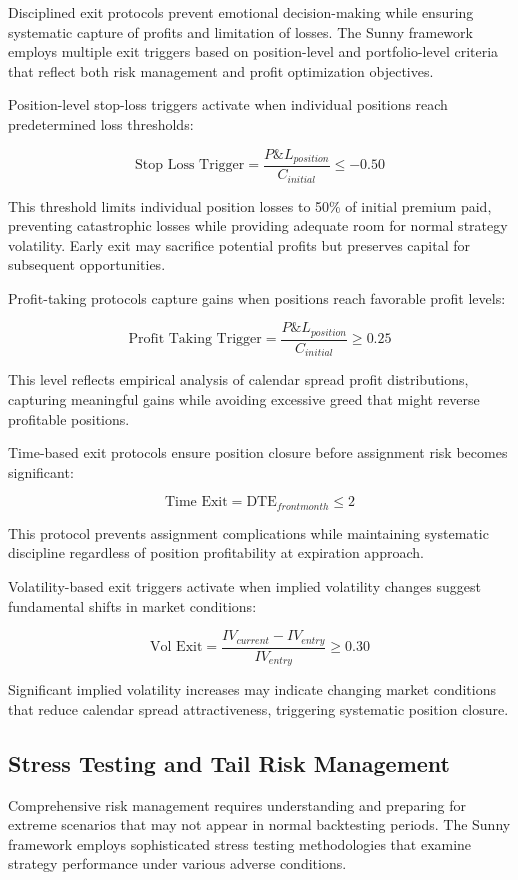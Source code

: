 \documentclass[
  american,
  11pt,
  11pt,
  letterpaper,
  onecolumn]{article}
\begin{document}
Disciplined exit protocols prevent emotional decision-making while
ensuring systematic capture of profits and limitation of losses. The
Sunny framework employs multiple exit triggers based on position-level
and portfolio-level criteria that reflect both risk management and
profit optimization objectives.

Position-level stop-loss triggers activate when individual positions
reach predetermined loss thresholds:

\[\text{Stop Loss Trigger} = \frac{P\&L_{position}}{C_{initial}} \leq -0.50\]

This threshold limits individual position losses to 50\% of initial
premium paid, preventing catastrophic losses while providing adequate
room for normal strategy volatility. Early exit may sacrifice potential
profits but preserves capital for subsequent opportunities.

Profit-taking protocols capture gains when positions reach favorable
profit levels:

\[\text{Profit Taking Trigger} = \frac{P\&L_{position}}{C_{initial}} \geq 0.25\]

This level reflects empirical analysis of calendar spread profit
distributions, capturing meaningful gains while avoiding excessive greed
that might reverse profitable positions.

Time-based exit protocols ensure position closure before assignment risk
becomes significant:

\[\text{Time Exit} = \text{DTE}_{front month} \leq 2\]

This protocol prevents assignment complications while maintaining
systematic discipline regardless of position profitability at expiration
approach.

Volatility-based exit triggers activate when implied volatility changes
suggest fundamental shifts in market conditions:

\[\text{Vol Exit} = \frac{IV_{current} - IV_{entry}}{IV_{entry}} \geq 0.30\]

Significant implied volatility increases may indicate changing market
conditions that reduce calendar spread attractiveness, triggering
systematic position closure.

\subsection{Stress Testing and Tail Risk
Management}\label{stress-testing-and-tail-risk-management}

Comprehensive risk management requires understanding and preparing for
extreme scenarios that may not appear in normal backtesting periods. The
Sunny framework employs sophisticated stress testing methodologies that
examine strategy performance under various adverse conditions.
\end{document}
